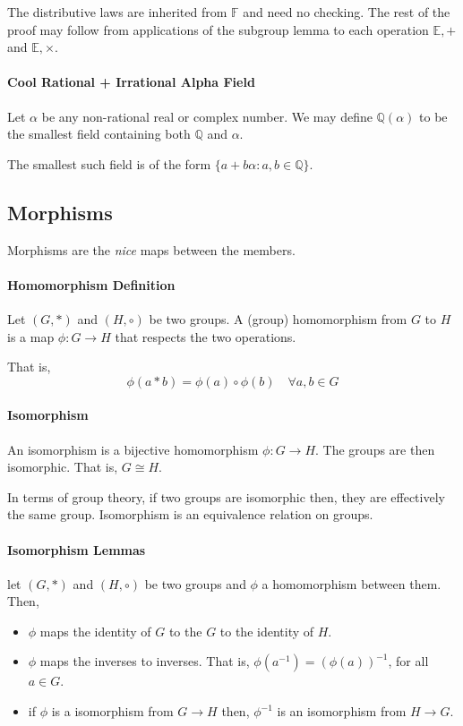 The distributive laws are inherited from \(\mathbb{F}\) and need no checking.
The rest of the proof may follow from applications of the subgroup lemma
to each operation \(\mathbb{E}, +\) and \(\mathbb{E}, \times\).

\paragraph{Cool Rational + Irrational Alpha Field}
Let \(\alpha\) be any non-rational real or complex number.
We may define \( \mathbb{Q}(\alpha)\) to be the smallest field containing both
\(\mathbb{Q}\) and \(\alpha\).

The smallest such field is of the form \(\{
    a + b\alpha : a, b \in \mathbb{Q}
\}\).

\subsection{Morphisms}
Morphisms are the \textit{nice} maps between the members.

\paragraph{Homomorphism Definition}
Let \((G, *)\) and \((H, \circ)\) be two groups.
A (group) homomorphism from \(G\) to \(H\) is a map
\(\phi : G \to H\) that respects the two operations.

That is, \[
    \phi(a*b) = \phi(a) \circ \phi(b) \quad \forall a,b \in G
\]

\paragraph{Isomorphism}
An isomorphism is a bijective homomorphism \(\phi : G\to H\).
The groups are then isomorphic. That is, \(G \cong H\).

In terms of group theory, if two groups are isomorphic then,
they are effectively the same group. Isomorphism is an equivalence
relation on groups.

\paragraph{Isomorphism Lemmas}
let \((G, *)\) and \((H, \circ)\) be two groups and \(\phi\) a homomorphism
between them.
Then,
\begin{itemize}
    \item \(\phi\) maps the identity of \(G\) to the \( G \) to the
    identity of \(H\).
    \item \(\phi\) maps the inverses to inverses. That is,
    \(\phi(a^{-1}) = (\phi(a))^{-1}\), for all \(a \in G\).
    \item if \(\phi\) is a isomorphism from \(G \to H\) then,
    \(\phi^{-1}\) is an isomorphism from \(H \to G\).
\end{itemize}

